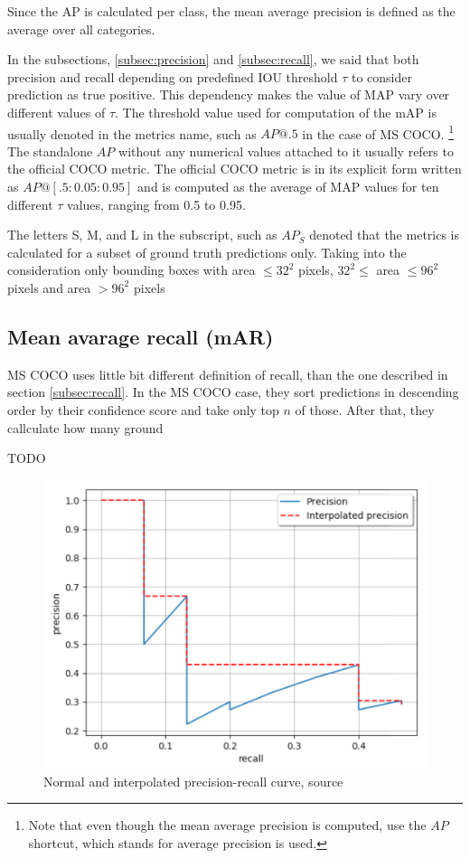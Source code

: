 Since the AP is calculated per class, the mean average precision is defined as the average over all categories.

In the subsections, \ref{subsec:precision} and \ref{subsec:recall}, we said that both precision and recall depending on predefined IOU threshold $\tau$ to consider prediction as true positive. This dependency makes the value of MAP vary over different values of $\tau$. The threshold value used for computation of the mAP is usually denoted in the metrics name, such as $AP@.5$ in the case of MS COCO. \footnote{Note that even though the mean average precision is computed, use the $AP$ shortcut, which stands for average precision is used.} The standalone $AP$ without any numerical values attached to it usually refers to the official COCO metric. The official COCO metric is in its explicit form written as $AP@[.5:0.05:0.95]$ and is computed as the average of MAP values for ten different $\tau$ values, ranging from 0.5 to 0.95.

The letters S, M,  and L in the subscript, such as $AP_S$ denoted that the metrics is calculated for a subset of ground truth predictions only. Taking into the consideration only bounding boxes with area $\leq 32^2$ pixels, $32^2 \le $ area $ \leq 96^2$ pixels and area $> 96^2$ pixels

\subsection{Mean avarage recall (mAR)}
MS COCO uses little bit different definition of recall, than the one described in section \ref{subsec:recall}. In the MS COCO case, they sort predictions in descending order by their confidence score and take only top $n$ of those. After that, they callculate how many ground

TODO


\begin{figure}
    \includegraphics[width = \linewidth]{images/PR-curve.png}
    \caption{Normal and interpolated precision-recall curve, source \cite{Padilla2020}}
    \label{fig:pr_curve}
\end{figure}


